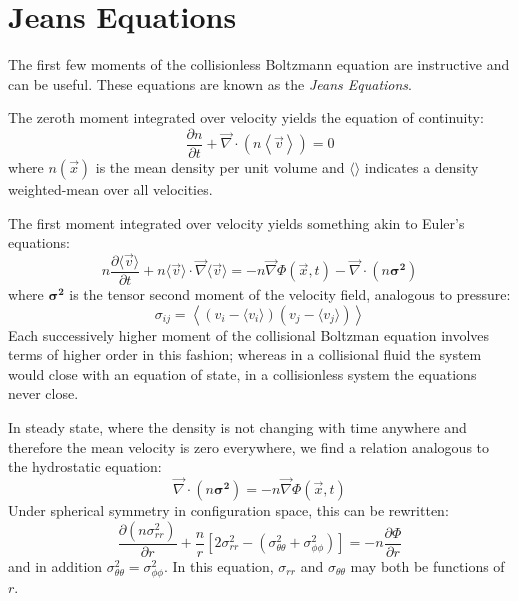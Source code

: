 \section{Jeans Equations}

The first few moments of the collisionless Boltzmann equation are
instructive and can be useful. These equations are known as the {\it
Jeans Equations}.

The zeroth moment integrated over velocity yields the equation of
continuity:
\begin{equation}
\frac{\partial n}{\partial t}
+ \vec{\nabla} \cdot\left(n \left\langle\vec{v}\right\rangle\right) =
0
\end{equation}
where $n(\vec{x})$ is the mean density per unit volume and
$\langle\rangle$ indicates a density weighted-mean over all
velocities.

The first moment integrated over velocity yields something akin to
Euler's equations:
\begin{equation}
\label{eq:euler}
n \frac{\partial \langle\vec{v}\rangle}{\partial t}
 + n \langle \vec{v} \rangle \cdot
 \vec{\nabla} \langle\vec{v}\rangle
  = -n \vec{\nabla}\Phi(\vec{x}, t) - \vec{\nabla} \cdot(n
 {\mathbf{\sigma^2}})
\end{equation}
where ${\mathbf{\sigma^2}}$ is the tensor second moment of the velocity
field, analogous to pressure:
\begin{equation}
\sigma_{ij} = \left\langle \left(v_i - \langle v_i \rangle\right)
\left(v_j - \langle v_j \rangle\right) \right\rangle
\end{equation}
Each successively higher moment of the collisional Boltzman equation
involves terms of higher order in this fashion; whereas in a
collisional fluid the system would close with an equation of state, in
a collisionless system the equations never close.

In steady state, where the density is not changing with time anywhere
and therefore the mean velocity is zero everywhere, we find a relation
analogous to the hydrostatic equation:
\begin{equation}
 \label{eq:steady}
 \vec{\nabla} \cdot(n
 {\mathbf{\sigma^2}}) = -n \vec{\nabla}\Phi(\vec{x}, t)
\end{equation}
Under spherical symmetry in configuration space, this can be
rewritten:
\begin{equation}
 \label{eq:spherical}
\frac{\partial(n \sigma_{rr}^2)}{\partial r}
+ \frac{n}{r} \left[2 \sigma_{rr}^2
- \left(\sigma_{\theta\theta}^2 + \sigma_{\phi\phi}^2\right)\right] =
- n \frac{\partial \Phi}{\partial r}
\end{equation}
and in addition $\sigma_{\theta\theta}^2 = \sigma_{\phi\phi}^2$. In
this equation, $\sigma_{rr}$ and $\sigma_{\theta\theta}$ may both be
functions of $r$.

